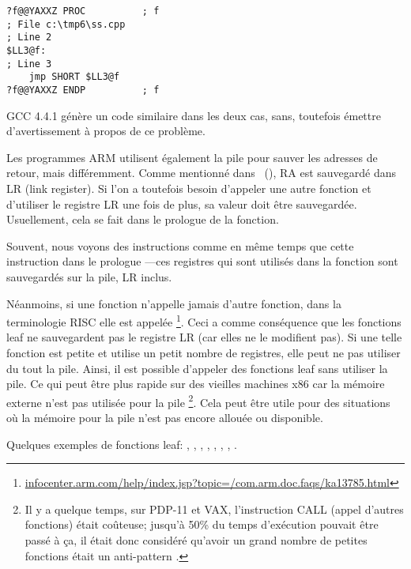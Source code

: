 \begin{lstlisting}[style=customasmx86]
?f@@YAXXZ PROC			; f
; File c:\tmp6\ss.cpp
; Line 2
$LL3@f:
; Line 3
	jmp	SHORT $LL3@f
?f@@YAXXZ ENDP			; f
\end{lstlisting}

GCC 4.4.1 génère un code similaire dans les deux cas, sans, toutefois émettre
d'avertissement à propos de ce problème.


Les programmes ARM utilisent également la pile pour sauver les adresses de retour,
mais différemment.
Comme mentionné dans \q{\HelloWorldSectionName}~(),
\ac{RA} est sauvegardé dans \ac{LR} (\gls{link register}).
Si l'on a toutefois besoin d'appeler une autre fonction et d'utiliser le registre
\ac{LR} une fois de plus, sa valeur doit être sauvegardée.
Usuellement, cela se fait dans le prologue de la fonction.

Souvent, nous voyons des instructions comme  en même temps
que cette instruction dans le prologue ---ces registres qui
sont utilisés dans la fonction sont sauvegardés sur la pile, \ac{LR} inclus.

Néanmoins, si une fonction n'appelle jamais d'autre fonction, dans la terminologie
\ac{RISC} elle est appelée \footnote{\href{http://go.yurichev.com/17064}{infocenter.arm.com/help/index.jsp?topic=/com.arm.doc.faqs/ka13785.html}}.
Ceci a comme conséquence que les fonctions leaf ne sauvegardent pas le registre
\ac{LR} (car elles ne le modifient pas).
Si une telle fonction est petite et utilise un petit nombre de registres, elle
peut ne pas utiliser du tout la pile.
Ainsi, il est possible d'appeler des fonctions leaf sans utiliser la pile.
Ce qui peut être plus rapide sur des vieilles machines x86 car la mémoire externe
n'est pas utilisée pour la pile
\footnote{Il y a quelque temps, sur PDP-11 et VAX, l'instruction CALL (appel d'autres fonctions) était coûteuse; jusqu'à 50\%
du temps d'exécution pouvait être passé à ça, il était donc considéré qu'avoir un grand nombre de petites fonctions était un \gls{anti-pattern} .}.
Cela peut être utile pour des situations où la mémoire pour la pile n'est pas
encore allouée ou disponible.

Quelques exemples de fonctions leaf:
, ,
, , ,
, , .

